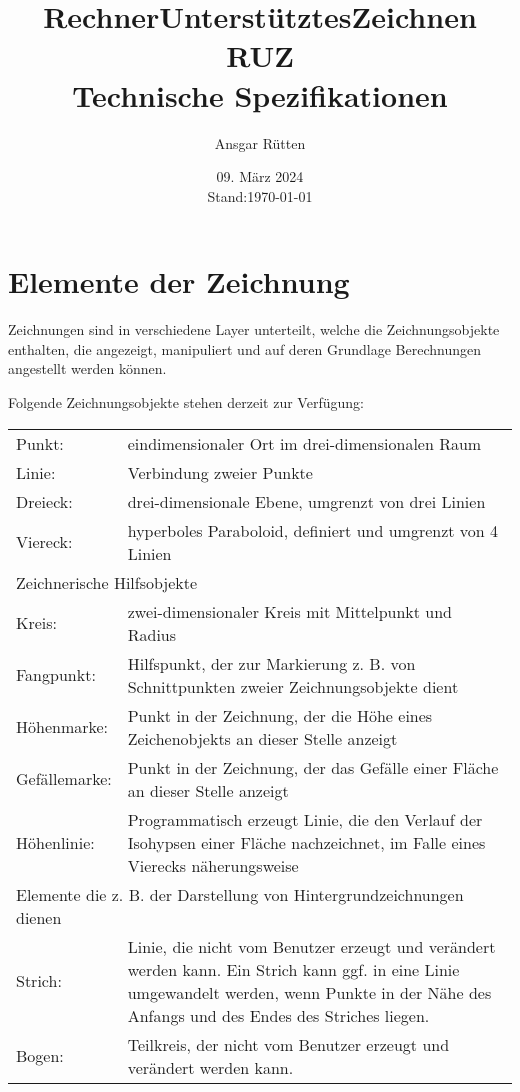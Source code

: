 \documentclass[ngerman]{article}
\title{\textbf{R}echner\textbf{U}nterstütztes\textbf{Z}eichnen RUZ\\Technische Spezifikationen}
\author{Ansgar Rütten}
\date{09. März 2024\\Stand:\today}
\begin{document}
\maketitle
\newpage
\tableofcontents
\newpage
\section{Elemente der Zeichnung}
Zeichnungen sind in verschiedene Layer unterteilt, welche die Zeichnungsobjekte enthalten, die angezeigt, manipuliert und auf deren Grundlage Berechnungen angestellt werden können.

Folgende Zeichnungsobjekte stehen derzeit zur Verfügung:

\begin{tabular}{p{2cm} p{9cm}}
	\toprule
	Punkt:		&eindimensionaler Ort im drei-dimensionalen Raum \\
	Linie:			&Verbindung zweier Punkte \\
	Dreieck:		&drei-dimensionale Ebene, umgrenzt von drei Linien \\
	Viereck:		&hyperboles Paraboloid, definiert und umgrenzt von 4 Linien \\
	\midrule
	\multicolumn{2}{l}{Zeichnerische Hilfsobjekte} \\
	\midrule
	Kreis:			&zwei-dimensionaler Kreis mit Mittelpunkt und Radius \\
	Fangpunkt:		&Hilfspunkt, der zur Markierung z. B. von Schnittpunkten zweier Zeichnungsobjekte dient \\
	Höhenmarke:	&Punkt in der Zeichnung, der die Höhe eines Zeichenobjekts an dieser Stelle anzeigt \\
	Gefällemarke:	&Punkt in der Zeichnung, der das Gefälle einer Fläche an dieser Stelle anzeigt \\
	Höhenlinie:		&Programmatisch erzeugt Linie, die den Verlauf der Isohypsen einer Fläche nachzeichnet, im Falle eines Vierecks näherungsweise \\
	\midrule
	\multicolumn{2}{l}{Elemente die z. B. der Darstellung von Hintergrundzeichnungen dienen} \\
	\midrule
	Strich:		&Linie, die nicht vom Benutzer erzeugt und verändert werden kann. Ein Strich kann ggf. in eine Linie umgewandelt werden, wenn Punkte in der Nähe des Anfangs und des Endes des Striches liegen. \\
	Bogen:		&Teilkreis, der nicht vom Benutzer erzeugt und verändert werden kann. \\
	\bottomrule
\end{tabular}




\end{document}
